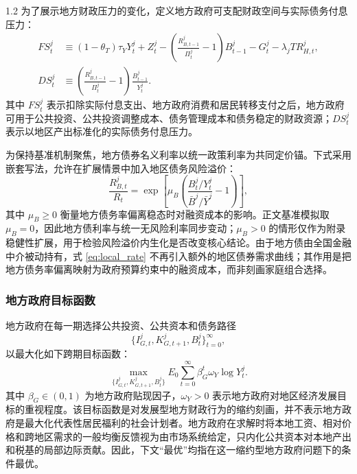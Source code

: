 \documentclass[12pt,UTF8]{ctexart}
\begin{document}
\begin{spacing}{1.2}
		为了展示地方财政压力的变化，定义地方政府可支配财政空间与实际债务付息压力：
		\begin{align}
			FS_t^j
			&\equiv
			(1-\theta_T)\tau_Y Y_t^j
			+Z_t^j
			-\left(
			\frac{R_{B,t-1}^j}{\Pi_t^j}-1
			\right)B_{t-1}^j
			-G_t^j
			-\lambda_jTR_{H,t}^j,
			\label{eq:FS}\\
			DS_t^j
			&\equiv
			\left(
			\frac{R_{B,t-1}^j}{\Pi_t^j}-1
			\right)
			\frac{B_{t-1}^j}{Y_t^j}.
			\label{eq:DS}
		\end{align}
		其中 $FS_t^j$ 表示扣除实际付息支出、地方政府消费和居民转移支付之后，地方政府可用于公共投资、公共投资调整成本、债务管理成本和债务稳定的财政资源；$DS_t^j$ 表示以地区产出标准化的实际债务付息压力。
		
		为保持基准机制聚焦，地方债券名义利率以统一政策利率为共同定价锚。下式采用嵌套写法，允许在扩展情景中加入地区债务风险溢价：
		\begin{equation}
			\frac{R_{B,t}^j}{R_t}
			=
			\exp\left[
			\mu_B
			\left(
			\frac{B_t^j/Y_t^j}{\bar B^j/\bar Y^j}
			-1
			\right)
			\right],
			\label{eq:local_rate}
		\end{equation}
		其中 $\mu_B\ge 0$ 衡量地方债务率偏离稳态时对融资成本的影响。正文基准模拟取 $\mu_B=0$，因此地方债利率与统一无风险利率同步变动；$\mu_B>0$ 的情形仅作为附录稳健性扩展，用于检验风险溢价内生化是否改变核心结论。由于地方债由全国金融中介被动持有，式 \eqref{eq:local_rate} 不再引入额外的地区债券需求曲线；其作用是把地方债务率偏离映射为政府预算约束中的融资成本，而非刻画家庭组合选择。
		
		\subsubsection{地方政府目标函数}
		
		地方政府在每一期选择公共投资、公共资本和债务路径
		\[
		\{I_{G,t}^j,K_{G,t+1}^j,B_t^j\}_{t=0}^{\infty},
		\]
		以最大化如下跨期目标函数：
		\begin{equation}
			\max_{\{I_{G,t}^j,K_{G,t+1}^j,B_t^j\}}
			E_0\sum_{t=0}^{\infty}\beta_G^t
			\omega_Y\log Y_t^j .
			\label{eq:gov_objective}
		\end{equation}
		其中 $\beta_G\in(0,1)$ 为地方政府贴现因子，$\omega_Y>0$ 表示地方政府对地区经济发展目标的重视程度。该目标函数是对发展型地方财政行为的缩约刻画，并不表示地方政府是最大化代表性居民福利的社会计划者。地方政府在求解时将本地工资、相对价格和跨地区需求的一般均衡反馈视为由市场系统给定，只内化公共资本对本地产出和税基的局部边际贡献。因此，下文“最优”均指在这一缩约型地方政府问题下的条件最优。


\end{spacing}
\end{document}
